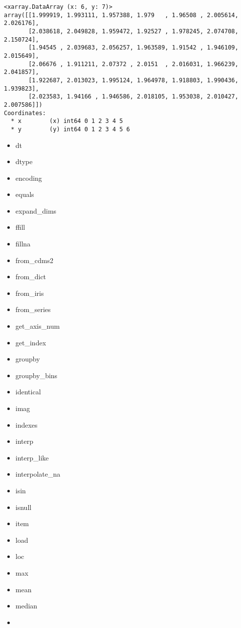 \documentclass[11pt]{article}
\begin{document}
    \begin{Verbatim}[commandchars=\\\{\}]
<xarray.DataArray (x: 6, y: 7)>
array([[1.999919, 1.993111, 1.957388, 1.979   , 1.96508 , 2.005614, 2.026176],
       [2.038618, 2.049828, 1.959472, 1.92527 , 1.978245, 2.074708, 2.150724],
       [1.94545 , 2.039683, 2.056257, 1.963589, 1.91542 , 1.946109, 2.015649],
       [2.06676 , 1.911211, 2.07372 , 2.0151  , 2.016031, 1.966239, 2.041857],
       [1.922687, 2.013023, 1.995124, 1.964978, 1.918803, 1.990436, 1.939823],
       [2.023583, 1.94166 , 1.946586, 2.018105, 1.953038, 2.010427, 2.007586]])
Coordinates:
  * x        (x) int64 0 1 2 3 4 5
  * y        (y) int64 0 1 2 3 4 5 6

    \end{Verbatim}

    \begin{itemize}
\item
  dt
\item
  dtype
\item
  encoding
\item
  equals
\item
  expand\_dims
\item
  ffill
\item
  fillna
\item
  from\_cdms2
\item
  from\_dict
\item
  from\_iris
\item
  from\_series
\item
  get\_axis\_num
\item
  get\_index
\item
  groupby
\item
  groupby\_bins
\item
  identical
\item
  imag
\item
  indexes
\item
  interp
\item
  interp\_like
\item
  interpolate\_na
\item
  isin
\item
  isnull
\item
  item
\item
  load
\item
  loc
\item
  max
\item
  mean
\item
  median
\item

\end{itemize}
\end{document}
